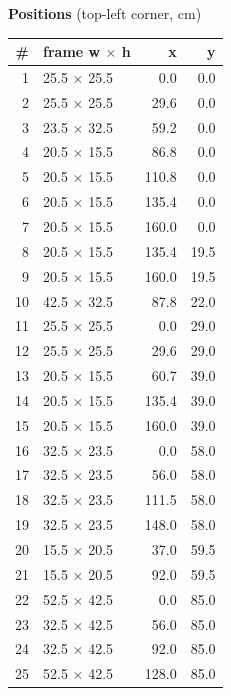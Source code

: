 \documentclass[a4paper,landscape,10pt]{article}
\begin{document}
\begin{minipage}[t]{0.25\textwidth}
\vspace{8pt}
{\bfseries Positions} (top-left corner, cm)\\[2pt]
\tiny
\begin{tabular}{@{}r l r r@{}}
\toprule
\# & frame w $\times$ h & x & y \\
\midrule
1 & 25.5 $\times$ 25.5 & 0.0 & 0.0 \\
2 & 25.5 $\times$ 25.5 & 29.6 & 0.0 \\
3 & 23.5 $\times$ 32.5 & 59.2 & 0.0 \\
4 & 20.5 $\times$ 15.5 & 86.8 & 0.0 \\
5 & 20.5 $\times$ 15.5 & 110.8 & 0.0 \\
6 & 20.5 $\times$ 15.5 & 135.4 & 0.0 \\
7 & 20.5 $\times$ 15.5 & 160.0 & 0.0 \\
8 & 20.5 $\times$ 15.5 & 135.4 & 19.5 \\
9 & 20.5 $\times$ 15.5 & 160.0 & 19.5 \\
10 & 42.5 $\times$ 32.5 & 87.8 & 22.0 \\
11 & 25.5 $\times$ 25.5 & 0.0 & 29.0 \\
12 & 25.5 $\times$ 25.5 & 29.6 & 29.0 \\
13 & 20.5 $\times$ 15.5 & 60.7 & 39.0 \\
14 & 20.5 $\times$ 15.5 & 135.4 & 39.0 \\
15 & 20.5 $\times$ 15.5 & 160.0 & 39.0 \\
16 & 32.5 $\times$ 23.5 & 0.0 & 58.0 \\
17 & 32.5 $\times$ 23.5 & 56.0 & 58.0 \\
18 & 32.5 $\times$ 23.5 & 111.5 & 58.0 \\
19 & 32.5 $\times$ 23.5 & 148.0 & 58.0 \\
20 & 15.5 $\times$ 20.5 & 37.0 & 59.5 \\
21 & 15.5 $\times$ 20.5 & 92.0 & 59.5 \\
22 & 52.5 $\times$ 42.5 & 0.0 & 85.0 \\
23 & 32.5 $\times$ 42.5 & 56.0 & 85.0 \\
24 & 32.5 $\times$ 42.5 & 92.0 & 85.0 \\
25 & 52.5 $\times$ 42.5 & 128.0 & 85.0 \\
\bottomrule
\end{tabular}
\end{minipage}
\clearpage
\end{document}
